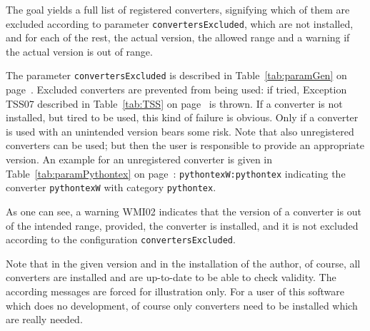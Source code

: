 The goal yields a full list of registered converters, 
signifying which of them are excluded 
according to parameter \texttt{convertersExcluded}, 
which are not installed, 
and for each of the rest, the actual version, the allowed range 
and a warning if the actual version is out of range. 

The parameter \texttt{convertersExcluded} 
is described in Table~\ref{tab:paramGen} on page~\pageref{tab:paramGen}. 
Excluded converters are prevented from being used: 
if tried, Exception TSS07 
described in Table~\ref{tab:TSS} on page~\pageref{tab:TSS} is thrown. 
If a converter is not installed, but tired to be used, 
this kind of failure is obvious. 
Only if a converter is used with an unintended version bears some risk. 
Note that also unregistered converters can be used; 
but then the user is responsible to provide an appropriate version. 
An example for an unregistered converter 
is given in Table~\ref{tab:paramPythontex} on page~\pageref{tab:paramPythontex}: 
\texttt{pythontexW:pythontex} 
indicating the converter \texttt{pythontexW} with category \texttt{pythontex}. 


As one can see, a warning WMI02 indicates 
that the version of a converter is out of the intended range, 
provided, the converter is installed, and it is not excluded 
according to the configuration \texttt{convertersExcluded}.

Note that in the given version and in the installation of the author,
of course, all converters are installed and are up-to-date
to be able to check validity.
The according messages are forced for illustration only. 
For a user of this software which does no development, 
of course only converters need to be installed which are really needed. 


